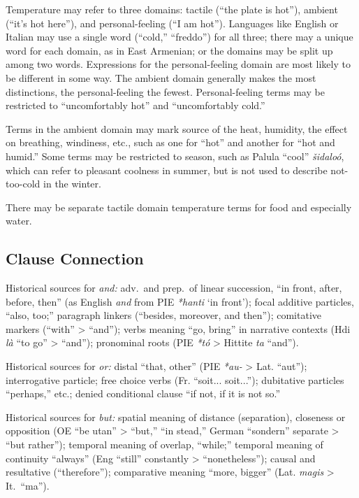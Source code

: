 \documentclass[11pt]{article}
\begin{document}
Temperature may refer to three domains: tactile (``the plate is
hot''), ambient (``it's hot here''), and personal-feeling (``I am
hot'').  Languages like English or Italian may use a single word
(``cold,'' ``freddo'') for all three; there may a unique word for each
domain, as in East Armenian; or the domains may be split up among two
words.  Expressions for the personal-feeling domain are most likely to
be different in some way.  The ambient domain generally makes the most
distinctions, the personal-feeling the fewest.  Personal-feeling terms
may be restricted to ``uncomfortably hot'' and ``uncomfortably cold.''

Terms in the ambient domain may mark source of the heat, humidity, the
effect on breathing, windiness, etc., such as one for ``hot'' and
another for ``hot and humid.''  Some terms may be restricted to
season, such as Palula ``cool'' \textit{šidaloó}, which can refer to
pleasant coolness in summer, but is not used to describe not-too-cold
in the winter.

There may be separate tactile domain temperature terms for food and
especially water.

\subsection{Clause Connection}
Historical sources for \textit{and:} adv.\ and prep.\ of linear
succession, ``in front, after, before, then'' (as English \textit{and}
from PIE \textit{*hanti} `in front'); focal additive particles, ``also,
too;'' paragraph linkers (``besides, moreover, and then''); comitative
markers (``with'' > ``and''); verbs meaning ``go, bring'' in narrative
contexts (Hdi \textit{là} ``to go'' > ``and''); pronominal roots (PIE
\textit{*tó} > Hittite \textit{ta} ``and'').

Historical sources for \textit{or:} distal ``that, other'' (PIE
\textit{*au-} > Lat. ``aut''); interrogative particle; free choice
verbs (Fr. ``soit... soit...''); dubitative particles ``perhaps,''
etc.; denied conditional clause ``if not, if it is not so.''

Historical sources for \textit{but:} spatial meaning of distance
(separation), closeness or opposition (OE ``be utan'' > ``but,'' ``in
stead,'' German ``sondern'' separate > ``but rather''); temporal
meaning of overlap, ``while;'' temporal meaning of continuity
``always'' (Eng ``still'' constantly > ``nonetheless''); causal and
resultative (``therefore''); comparative meaning ``more, bigger''
(Lat. \textit{magis} > It.\ ``ma'').
\end{document}
